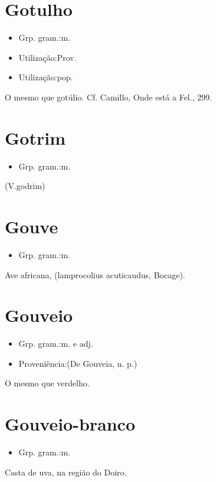 \section{Gotulho}
\begin{itemize}
\item {Grp. gram.:m.}
\end{itemize}
\begin{itemize}
\item {Utilização:Prov.}
\end{itemize}
\begin{itemize}
\item {Utilização:pop.}
\end{itemize}
O mesmo que \textunderscore gotúlio\textunderscore . Cf. Camillo, \textunderscore Onde está a Fel.\textunderscore , 299.
\section{Gotrim}
\begin{itemize}
\item {Grp. gram.:m.}
\end{itemize}
(V.godrim)
\section{Gouve}
\begin{itemize}
\item {Grp. gram.:m.}
\end{itemize}
Ave africana, (\textunderscore lamprocolius acuticaudus\textunderscore , Bocage).
\section{Gouveio}
\begin{itemize}
\item {Grp. gram.:m.  e  adj.}
\end{itemize}
\begin{itemize}
\item {Proveniência:(De \textunderscore Gouveia\textunderscore , n. p.)}
\end{itemize}
O mesmo que \textunderscore verdelho\textunderscore .
\section{Gouveio-branco}
\begin{itemize}
\item {Grp. gram.:m.}
\end{itemize}
Casta de uva, na região do Doiro.

